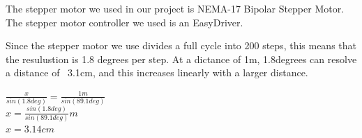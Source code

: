 The stepper motor we used in our project is NEMA-17 Bipolar Stepper Motor. \cite{steppermotor}
The stepper motor controller we used is an EasyDriver.\cite{steppercontroller}



Since the stepper motor we use divides a full cycle into 200 steps, this means that the resulustion is 1.8 degrees per step. At a dictance of 1m, 1.8degrees can resolve a distance of ~3.1cm, and this increases linearly with a larger distance.

$\frac{x}{sin(1.8deg)} = \frac{1m}{sin(89.1deg)}$ \\
$x = \frac{sin(1.8deg)}{sin(89.1deg)}m$ \\
$x = 3.14cm$ \\


